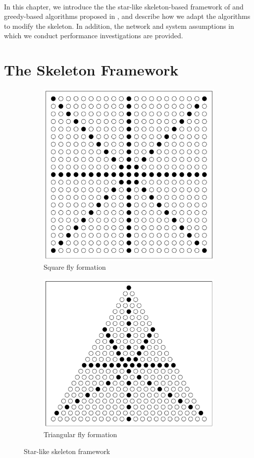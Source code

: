 \documentclass[a4paper,12pt]{report}
\begin{document}
\paragraph{}
In this chapter, we introduce the the star-like skeleton-based framework of \cite{ssr} and greedy-based algorithms proposed in \cite{prose}, and describe how we adapt the algorithms to modify the skeleton. In addition, the network and system assumptions in which we conduct performance investigations are provided.

\section{The Skeleton Framework}
\begin{figure}[tbph]
\begin{subfigure}{.5\textwidth}
  \centering
  \includegraphics[width=.8\linewidth]{images/square.png}
  \caption{Square fly formation}
  \label{fig:sfig1}
\end{subfigure}%
\begin{subfigure}{.5\textwidth}
  \centering
  \includegraphics[width=.8\linewidth]{images/triangle.png}
  \caption{Triangular fly formation}
  \label{fig:sfig2}
\end{subfigure}
\caption{Star-like skeleton framework}
\label{fig:fig}
\end{figure}
\end{document}
